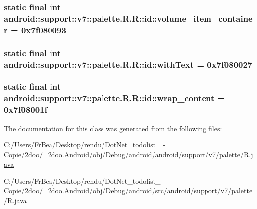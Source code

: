\hypertarget{classandroid_1_1support_1_1v7_1_1palette_1_1_r_1_1id_e2ff99f8d8af059dce49bfa3fe337247}{
\subsubsection[{volume\_\-item\_\-container}]{\setlength{\rightskip}{0pt plus 5cm}static final int android::support::v7::palette.R.R::id::volume\_\-item\_\-container = 0x7f080093}}
\label{classandroid_1_1support_1_1v7_1_1palette_1_1_r_1_1id_e2ff99f8d8af059dce49bfa3fe337247}


\hypertarget{classandroid_1_1support_1_1v7_1_1palette_1_1_r_1_1id_532731934643a4e65df770cfbb40a3b9}{
\subsubsection[{withText}]{\setlength{\rightskip}{0pt plus 5cm}static final int android::support::v7::palette.R.R::id::withText = 0x7f080027}}
\label{classandroid_1_1support_1_1v7_1_1palette_1_1_r_1_1id_532731934643a4e65df770cfbb40a3b9}


\hypertarget{classandroid_1_1support_1_1v7_1_1palette_1_1_r_1_1id_7775e5cbef7f79c2aee7c90cc32336a8}{
\subsubsection[{wrap\_\-content}]{\setlength{\rightskip}{0pt plus 5cm}static final int android::support::v7::palette.R.R::id::wrap\_\-content = 0x7f08001f}}
\label{classandroid_1_1support_1_1v7_1_1palette_1_1_r_1_1id_7775e5cbef7f79c2aee7c90cc32336a8}




The documentation for this class was generated from the following files:\begin{CompactItemize}
\item 
C:/Users/FrBea/Desktop/rendu/DotNet\_\-todolist\_ - Copie/2doo/\_\-2doo.Android/obj/Debug/android/android/support/v7/palette/\hyperlink{android_2support_2v7_2palette_2_r_8java}{R.java}\item 
C:/Users/FrBea/Desktop/rendu/DotNet\_\-todolist\_ - Copie/2doo/\_\-2doo.Android/obj/Debug/android/src/android/support/v7/palette/\hyperlink{src_2android_2support_2v7_2palette_2_r_8java}{R.java}\end{CompactItemize}
